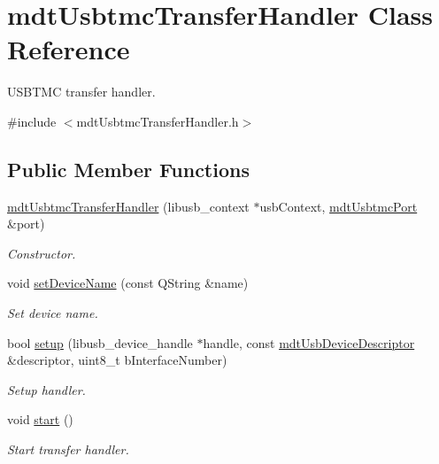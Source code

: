 \hypertarget{classmdt_usbtmc_transfer_handler}{\section{mdt\-Usbtmc\-Transfer\-Handler Class Reference}
\label{classmdt_usbtmc_transfer_handler}
}


U\-S\-B\-T\-M\-C transfer handler.  




{\ttfamily \#include $<$mdt\-Usbtmc\-Transfer\-Handler.\-h$>$}

\subsection*{Public Member Functions}
\begin{DoxyCompactItemize}
\item 
\hyperlink{classmdt_usbtmc_transfer_handler_af40f6740a823a75628890eb04466e2b8}{mdt\-Usbtmc\-Transfer\-Handler} (libusb\-\_\-context $\ast$usb\-Context, \hyperlink{classmdt_usbtmc_port}{mdt\-Usbtmc\-Port} \&port)
\begin{DoxyCompactList}\small\item\em Constructor. \end{DoxyCompactList}\item 
void \hyperlink{classmdt_usbtmc_transfer_handler_ae824f384cc1dd1f860462cf1d6ebf3aa}{set\-Device\-Name} (const Q\-String \&name)
\begin{DoxyCompactList}\small\item\em Set device name. \end{DoxyCompactList}\item 
bool \hyperlink{classmdt_usbtmc_transfer_handler_a6771b010d3d050c7edae058996eb5a8d}{setup} (libusb\-\_\-device\-\_\-handle $\ast$handle, const \hyperlink{classmdt_usb_device_descriptor}{mdt\-Usb\-Device\-Descriptor} \&descriptor, uint8\-\_\-t b\-Interface\-Number)
\begin{DoxyCompactList}\small\item\em Setup handler. \end{DoxyCompactList}\item 
void \hyperlink{classmdt_usbtmc_transfer_handler_aa42e173d97b63438ab7e593909ee7d2b}{start} ()
\begin{DoxyCompactList}\small\item\em Start transfer handler. \end{DoxyCompactList}\item 

\end{DoxyCompactItemize}
